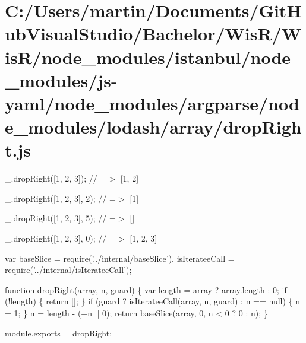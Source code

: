 \hypertarget{_c_1_2_users_2martin_2_documents_2_git_hub_visual_studio_2_bachelor_2_wis_r_2_wis_r_2node_module15253c61807459a50c1d351ebc683b73}{}\section{C\+:/\+Users/martin/\+Documents/\+Git\+Hub\+Visual\+Studio/\+Bachelor/\+Wis\+R/\+Wis\+R/node\+\_\+modules/istanbul/node\+\_\+modules/js-\/yaml/node\+\_\+modules/argparse/node\+\_\+modules/lodash/array/drop\+Right.\+js}
\+\_\+.\+drop\+Right(\mbox{[}1, 2, 3\mbox{]}); // =$>$ \mbox{[}1, 2\mbox{]}

\+\_\+.\+drop\+Right(\mbox{[}1, 2, 3\mbox{]}, 2); // =$>$ \mbox{[}1\mbox{]}

\+\_\+.\+drop\+Right(\mbox{[}1, 2, 3\mbox{]}, 5); // =$>$ \mbox{[}\mbox{]}

\+\_\+.\+drop\+Right(\mbox{[}1, 2, 3\mbox{]}, 0); // =$>$ \mbox{[}1, 2, 3\mbox{]}


\begin{DoxyCodeInclude}
var baseSlice = require(\textcolor{stringliteral}{'../internal/baseSlice'}),
    isIterateeCall = require(\textcolor{stringliteral}{'../internal/isIterateeCall'});

\textcolor{keyword}{function} dropRight(array, n, guard) \{
  var length = array ? array.length : 0;
  \textcolor{keywordflow}{if} (!length) \{
    \textcolor{keywordflow}{return} [];
  \}
  \textcolor{keywordflow}{if} (guard ? isIterateeCall(array, n, guard) : n == null) \{
    n = 1;
  \}
  n = length - (+n || 0);
  \textcolor{keywordflow}{return} baseSlice(array, 0, n < 0 ? 0 : n);
\}

module.exports = dropRight;
\end{DoxyCodeInclude}
 